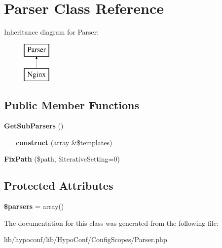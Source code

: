 \hypertarget{class_hypo_conf_1_1_config_scopes_1_1_parser}{
\section{\-Parser \-Class \-Reference}
\label{class_hypo_conf_1_1_config_scopes_1_1_parser}
}
\-Inheritance diagram for \-Parser\-:\begin{figure}[H]
\begin{center}
\leavevmode
\includegraphics[height=2.000000cm]{class_hypo_conf_1_1_config_scopes_1_1_parser}
\end{center}
\end{figure}
\subsection*{\-Public \-Member \-Functions}
\begin{DoxyCompactItemize}
\item 
\hypertarget{class_hypo_conf_1_1_config_scopes_1_1_parser_aeb0de53a7b91fb804a09fe4d249fcf64}{
{\bfseries \-Get\-Sub\-Parsers} ()}
\label{class_hypo_conf_1_1_config_scopes_1_1_parser_aeb0de53a7b91fb804a09fe4d249fcf64}

\item 
\hypertarget{class_hypo_conf_1_1_config_scopes_1_1_parser_af5f07f8aed679755846412e7a1839117}{
{\bfseries \-\_\-\-\_\-construct} (array \&\$templates)}
\label{class_hypo_conf_1_1_config_scopes_1_1_parser_af5f07f8aed679755846412e7a1839117}

\item 
\hypertarget{class_hypo_conf_1_1_config_scopes_1_1_parser_a89da0f26f5a59610dff3b5e50a84169b}{
{\bfseries \-Fix\-Path} (\$path, \$iterative\-Setting=0)}
\label{class_hypo_conf_1_1_config_scopes_1_1_parser_a89da0f26f5a59610dff3b5e50a84169b}

\end{DoxyCompactItemize}
\subsection*{\-Protected \-Attributes}
\begin{DoxyCompactItemize}
\item 
\hypertarget{class_hypo_conf_1_1_config_scopes_1_1_parser_ae7df9b3add8c1b302615fc85fbd27de0}{
{\bfseries \$parsers} = array()}
\label{class_hypo_conf_1_1_config_scopes_1_1_parser_ae7df9b3add8c1b302615fc85fbd27de0}

\end{DoxyCompactItemize}


\-The documentation for this class was generated from the following file\-:\begin{DoxyCompactItemize}
\item 
lib/hypoconf/lib/\-Hypo\-Conf/\-Config\-Scopes/\-Parser.\-php\end{DoxyCompactItemize}
